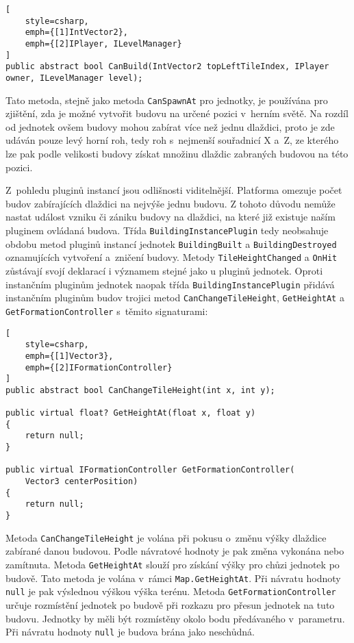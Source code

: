 \begin{lstlisting}[
	style=csharp,
	emph={[1]IntVector2},
	emph={[2]IPlayer, ILevelManager}
]
public abstract bool CanBuild(IntVector2 topLeftTileIndex, IPlayer owner, ILevelManager level);
\end{lstlisting}

Tato metoda, stejně jako metoda \texttt{CanSpawnAt} pro jednotky, je používána pro zjištění, zda je možné vytvořit budovu na určené pozici v~herním světě. Na rozdíl od jednotek ovšem budovy mohou zabírat více než jednu dlaždici, proto je zde udáván pouze levý horní roh, tedy roh s~nejmenší souřadnicí X a~Z, ze kterého lze pak podle velikosti budovy získat množinu dlaždic zabraných budovou na této pozici. 


Z~pohledu pluginů instancí jsou odlišnosti viditelnější. Platforma omezuje počet budov zabírajících dlaždici na nejvýše jednu budovu. Z tohoto důvodu nemůže nastat událost vzniku či zániku budovy na dlaždici, na které již existuje naším pluginem ovládaná budova. Třída \texttt{BuildingInstancePlugin} tedy neobsahuje obdobu metod pluginů instancí jednotek \texttt{BuildingBuilt} a \texttt{BuildingDestroyed} oznamujících vytvoření a~zničení budovy. Metody \texttt{TileHeightChanged} a \texttt{OnHit} zůstávají svojí deklarací i významem stejné jako u pluginů jednotek. Oproti instančním pluginům jednotek naopak třída \texttt{BuildingInstancePlugin} přidává instančním pluginům budov trojici metod \texttt{CanChangeTileHeight}, \texttt{GetHeightAt} a \texttt{GetFormationController} s~těmito signaturami:

\begin{lstlisting}[
	style=csharp,
	emph={[1]Vector3},
	emph={[2]IFormationController}
]
public abstract bool CanChangeTileHeight(int x, int y);

public virtual float? GetHeightAt(float x, float y)
{
	return null;
}

public virtual IFormationController GetFormationController(
	Vector3 centerPosition)
{
	return null;
}
\end{lstlisting}

Metoda \texttt{CanChangeTileHeight} je volána při pokusu o~změnu výšky dlaždice zabírané danou budovou. Podle návratové hodnoty je pak změna vykonána nebo zamítnuta. Metoda \texttt{GetHeightAt} slouží pro získání výšky pro chůzi jednotek po budově. Tato metoda je volána v~rámci \texttt{Map.GetHeightAt}. Při návratu hodnoty \texttt{null} je pak výslednou výškou výška terénu. Metoda \texttt{GetFormationController} určuje rozmístění jednotek po budově při rozkazu pro přesun jednotek na tuto budovu. Jednotky by měli být rozmístěny okolo bodu předávaného v~parametru. Při návratu hodnoty \texttt{null} je budova brána jako neschůdná.



